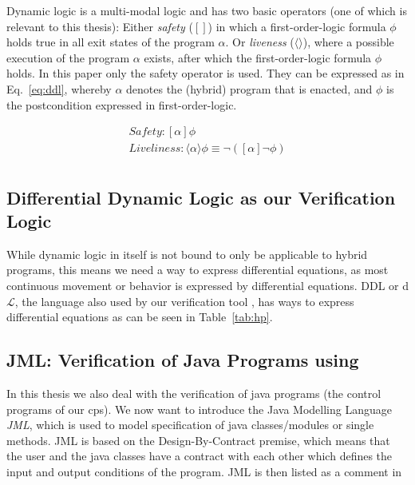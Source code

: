 Dynamic logic is a multi-modal logic and has two basic operators (one of which is relevant to this thesis): Either \textit{safety} (\([]\)) in which a first-order-logic formula \(\phi\) holds true in all exit states of the program \(\alpha\). Or \textit{liveness} (\(\langle\rangle\)), where a possible execution of the program \(\alpha\) exists, after which the first-order-logic formula \(\phi\) holds. In this paper only the safety operator is used. They can be expressed as in Eq.~\ref{eq:ddl}, whereby \(\alpha\) denotes the (hybrid) program that is enacted, and \(\phi\) is the postcondition expressed in first-order-logic.

\begin{equation}
	\label{eq:ddl}
	\begin{split}
		Safety: [\alpha]\phi \\
		Liveliness: \langle\alpha\rangle\phi \equiv \neg ([\alpha] \neg \phi) \\
	\end{split}
\end{equation}

\subsection{Differential Dynamic Logic as our Verification Logic}
\label{subsec:DDL}

While dynamic logic in itself is not bound to only be applicable to hybrid programs, this means we need a way to express differential equations, as most continuous movement or behavior is expressed by differential equations. DDL or d\(\mathcal{L}\), the language also used by our verification tool \keym, has ways to express differential equations as can be seen in Table~\ref{tab:hp}.

\subsection{JML: Verification of Java Programs using \key}
\label{subsec:jml}

In this thesis we also deal with the verification of java programs (the control programs of our cps). We now want to introduce the Java Modelling Language \textit{JML}, which is used to model specification of java classes/modules or single methods. JML is based on the Design-By-Contract premise, which means that the user and the java classes have a contract with each other which defines the input and output conditions of the program. JML is then listed as a comment in

